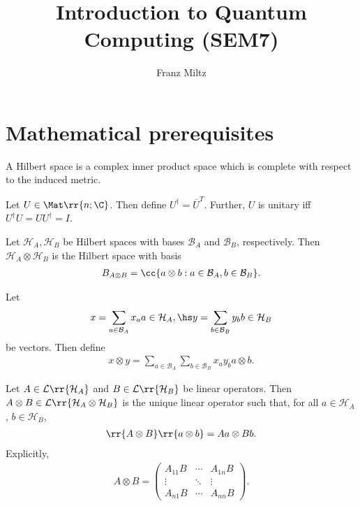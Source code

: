 \documentclass{article}
\title{Introduction to Quantum Computing (SEM7)}
\author{Franz Miltz}
\begin{document}
\maketitle
\tableofcontents
\pagebreak

\section{Mathematical prerequisites}
\label{sec:mathetmatical-prerequisites}

\begin{definition}
  \label{def:hilbert-space}
  A Hilbert space is a complex inner product space which is complete with respect to the induced metric.
\end{definition}

\begin{definition}
  \label{def:unitary-matrix}
  Let $U\in\Mat\rr{n; \C}$. Then define $U^\dagger = \overline{U}^T$. Further, $U$ is unitary iff
  $U^\dagger U =UU^\dagger = I$.
\end{definition}

\begin{definition}
  \label{def:tensor-product}
  Let $\mathcal H_A, \mathcal H_B$ be Hilbert spaces with bases $\mathcal B_A$ and
  $\mathcal B_B$, respectively. Then $\mathcal H_A\otimes\mathcal H_B$ is the Hilbert
  space with basis
  \begin{align*}
    B_{A\otimes B} = \cc{a \otimes b : a \in \mathcal B_A, b\in\mathcal B_B}.
  \end{align*}

  Let
  \begin{align*}
    x = \sum_{a\in\mathcal B_A} x_a a\in\mathcal H_A, \hs
    y = \sum_{b\in\mathcal B_B} y_b b\in\mathcal H_B
  \end{align*}
  be vectors. Then define
  \begin{align*}
    x \otimes y = \sum_{a\in\mathcal B_A}\sum_{b\in\mathcal B_B} x_a y_b a \otimes b.
  \end{align*}

  Let $A\in\mathcal L\rr{\mathcal H_A}$ and $B\in\mathcal L\rr{\mathcal H_B}$ be linear
  operators. Then $A\otimes B\in\mathcal L\rr{\mathcal H_A\otimes\mathcal H_B}$ is the
  unique linear operator such that, for all $a\in\mathcal H_A$, $b\in\mathcal H_B$,
  \begin{align*}
    \rr{A\otimes B}\rr{a \otimes b} = A a \otimes B b.
  \end{align*}
  Explicitly,
  \begin{align*}
    A \otimes B = \begin{pmatrix}
      A_{11} B & \cdots & A_{1n}B \\
      \vdots & \ddots & \vdots \\
      A_{n1} B & \cdots & A_{nn}B
    \end{pmatrix}.
  \end{align*}
\end{definition}
\end{document}
